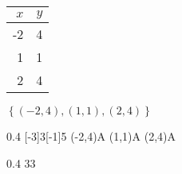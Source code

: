 

\noindent
\begin{minipage}{0.2\textwidth}
    \centering
    \begin{tabular}{r|r}
        $x$ & $y$ \\
        \hline\hline
        -2 & 4 \\
        1 & 1 \\
        2 & 4 \\
    \end{tabular}
\end{minipage}
\hfil
\begin{minipage}{0.2\textwidth}
    $
    \left\{
        (-2,4), (1,1), (2,4)
    \right\}
    $
\end{minipage}
\hfil
\begin{minipage}{0.2\textwidth}
    \centering
    \begin{myTikzpictureGrid}{0.4} [-3]{3}[-1]{5}
        \tkzDefPoint(-2,4){A} \myDrawPointA
        \tkzDefPoint(1,1){A} \myDrawPointA
        \tkzDefPoint(2,4){A} \myDrawPointA
    \end{myTikzpictureGrid}
\end{minipage}
\hfil
\begin{minipage}{0.2\textwidth}
    \centering
    \begin{myTikzpictureGrid}{0.4} {3}{3}
    \end{myTikzpictureGrid}
\end{minipage}